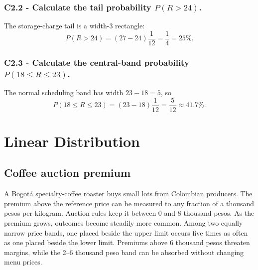 \subsubsection*{C2.2 - Calculate the tail probability $P(R>24)$.}
\label{subsec:c2-uniform-port-b}
The storage-charge tail is a width-$3$ rectangle:
\[
 P(R>24)=(27-24)\frac1{12}=\frac14=25\%.
\]

\subsubsection*{C2.3 - Calculate the central-band probability
$P(18\le R\le23)$.}
\label{subsec:c2-uniform-port-c}
The normal scheduling band has width $23-18=5$, so
\[
 P(18\le R\le23)=(23-18)\frac1{12}=\frac5{12}\approx41.7\%.
\]

\section{Linear Distribution}\label{sec:c2-linear-practice}

\subsection{Coffee auction premium}\label{sec:c2-linear-coffee}
A Bogotá specialty-coffee roaster buys small lots from Colombian producers.
The premium above the reference price can be measured to any fraction of a
thousand pesos per kilogram.  Auction rules keep it between 0 and 8 thousand
pesos.  As the premium grows, outcomes become steadily more common.  Among two
equally narrow price bands, one placed beside the upper limit occurs five times
as often as one placed beside the lower limit.  Premiums above 6 thousand pesos
threaten margins, while the 2--6 thousand peso band can be absorbed without
changing menu prices.

\begingroup{}
\endgroup

